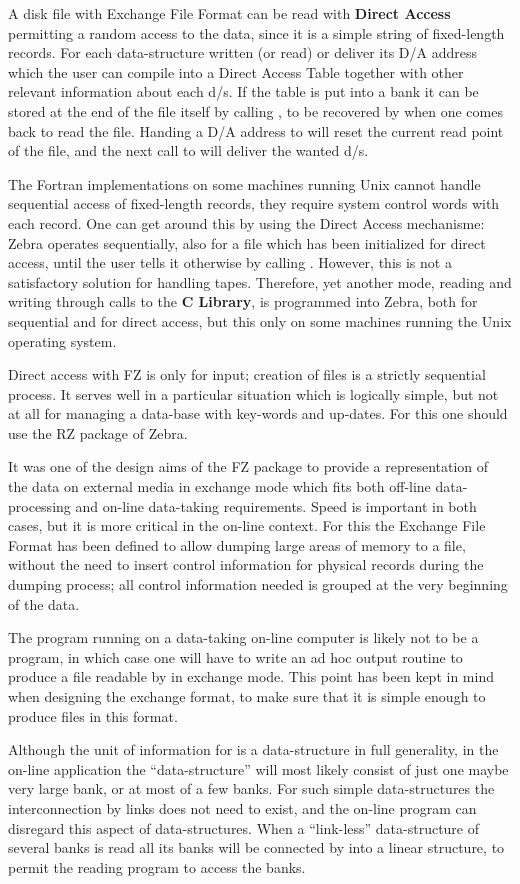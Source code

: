A disk file with Exchange File Format can be read with
\textbf{Direct Access}
permitting a random access to the data, since it is a
simple string of fixed-length records.
For each data-structure written (or read)  or  deliver
its D/A address which the user can compile into a Direct Access Table
together with other relevant information about each d/s.
If the table is put into a bank it can be stored
at the end of the file itself by calling ,
to be recovered by  when one comes back to read the file.
Handing a D/A address to  will reset the current read point
of the file, and the next call to  will deliver the wanted d/s.

The Fortran implementations on some machines running Unix
cannot handle sequential access of fixed-length records,
they require system control words with each record.
One can get around this by using the Direct Access mechanisme:
Zebra operates sequentially, also for a file which has been
initialized for direct access, until the user tells it otherwise
by calling .
However, this is not a satisfactory solution for handling tapes.
Therefore, yet another mode, reading and writing through calls
to the
\textbf{C Library}, is programmed into Zebra, both for sequential
and for direct access, but this only on some machines running
the Unix operating system.

Direct access with FZ is only for input;
creation of files is a strictly sequential process.
It serves well in a particular situation which is logically simple,
but not at all for managing a data-base with key-words
and up-dates.
For this one should use the RZ package of Zebra.

It was one of the design aims of the FZ package to provide
a representation of the data on external media in exchange mode
which fits both off-line data-processing and on-line data-taking
requirements.
Speed is important in both cases, but it is more critical in the
on-line context.
For this the \ZEBRA{} Exchange File Format has been defined to allow
dumping large areas of memory to a file,
without the need  to insert control information  for physical
records during the dumping process;
all control information needed is grouped at the very beginning
of the data.

The program running on a data-taking on-line computer is
likely not to be a \ZEBRA{} program,
in which case one will have to write an ad hoc output routine to
produce a file readable by  in exchange mode.
This point has been kept in mind when designing the exchange format,
to make sure that it is simple enough
to produce files in this format.

Although the unit of information for \ZEBRA{} is a data-structure
in full generality,
in the on-line application the
``data-structure'' will most likely consist of just one maybe
very large bank,
or at most of a few banks.
For such simple data-structures the interconnection
by links does not need to exist,
and the on-line program can disregard this aspect of
data-structures.
When a ``link-less'' data-structure of several banks is read
all its banks will be connected by  into
a linear structure, to permit the reading program to access
the banks.

